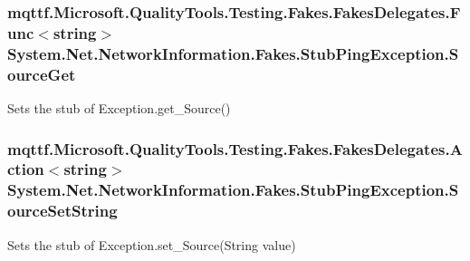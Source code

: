 \hypertarget{class_system_1_1_net_1_1_network_information_1_1_fakes_1_1_stub_ping_exception_a6b802aab21086ef9ea7485c8873d0fa1}{
\subsubsection[{Source\-Get}]{\setlength{\rightskip}{0pt plus 5cm}mqttf.\-Microsoft.\-Quality\-Tools.\-Testing.\-Fakes.\-Fakes\-Delegates.\-Func$<$string$>$ System.\-Net.\-Network\-Information.\-Fakes.\-Stub\-Ping\-Exception.\-Source\-Get}}\label{class_system_1_1_net_1_1_network_information_1_1_fakes_1_1_stub_ping_exception_a6b802aab21086ef9ea7485c8873d0fa1}


Sets the stub of Exception.\-get\-\_\-\-Source()

\hypertarget{class_system_1_1_net_1_1_network_information_1_1_fakes_1_1_stub_ping_exception_a62c89b6889df191c831ca0dae2cc4ce6}{
\subsubsection[{Source\-Set\-String}]{\setlength{\rightskip}{0pt plus 5cm}mqttf.\-Microsoft.\-Quality\-Tools.\-Testing.\-Fakes.\-Fakes\-Delegates.\-Action$<$string$>$ System.\-Net.\-Network\-Information.\-Fakes.\-Stub\-Ping\-Exception.\-Source\-Set\-String}}\label{class_system_1_1_net_1_1_network_information_1_1_fakes_1_1_stub_ping_exception_a62c89b6889df191c831ca0dae2cc4ce6}


Sets the stub of Exception.\-set\-\_\-\-Source(\-String value)


